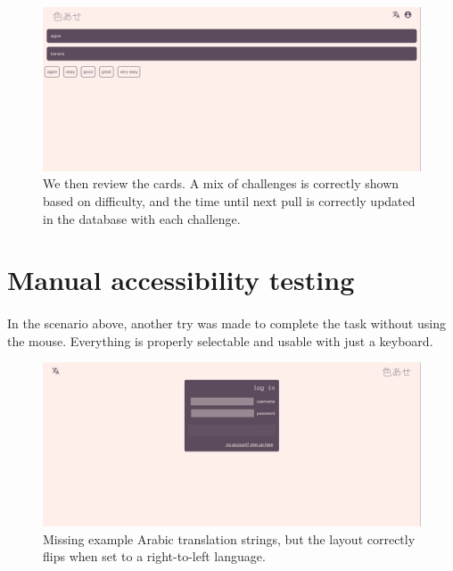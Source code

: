 \documentclass{report}
\begin{document}
\begin{figure}[H]
  \centering
  \includegraphics[width=\textwidth]{./media/evaluation/review.png}
  \caption{We then review the cards. A mix of challenges is correctly shown based on difficulty, and the time until next pull is correctly updated in the database with each challenge.}
  \label{fig:review}
\end{figure}

\section{Manual accessibility testing}
\paragraph{}
In the scenario above, another try was made to complete the task without using the mouse. Everything is properly selectable and usable with just a keyboard.

\begin{figure}[H]
  \centering
  \includegraphics[width=\textwidth]{./media/evaluation/rtl.png}
  \caption{Missing example Arabic translation strings, but the layout correctly flips when set to a right-to-left language.}
  \label{fig:rtl}
\end{figure}
\end{document}
